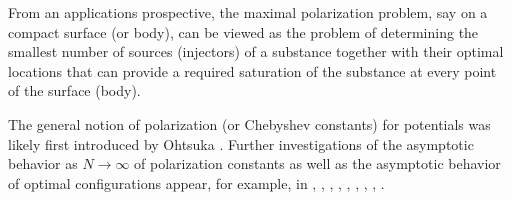 \documentclass[12pt]{amsart}
\theoremstyle{definition}
\newcommand{\1}{\mathbf{1}}
\begin{document}
From an applications prospective, the maximal polarization problem, say on a compact surface (or body), can be viewed as the problem of determining the smallest number of sources (injectors) of a substance together with their optimal locations that can provide a required saturation of the substance at every point of the surface (body). 

The general notion of polarization (or Chebyshev constants) for potentials was likely first introduced by Ohtsuka \cite{Ohtsuka1967}. Further investigations of the asymptotic behavior as $N\to \infty$ of polarization constants as well as the asymptotic behavior of optimal configurations appear, for example, in \cite{Ambrus2013}, \cite{Erdelyi2013}, \cite{Farkas2006}, \cite{Farkas2008}, \cite{borodachov2014asymptotics}, \cite{Simanek2015}, \cite{Borodachov2016}, \cite{borodachov2016optimal}, \cite{reznikov2016minimum}.
\end{document}
